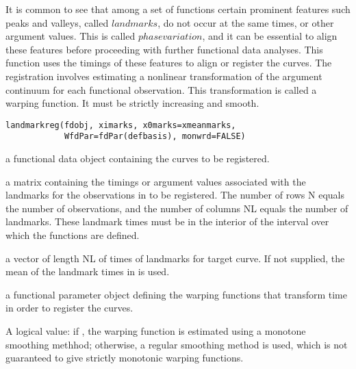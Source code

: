 \begin{Description}\relax
It is common to see that among a set of functions certain prominent
features such peaks and valleys, called $landmarks$, do not occur
at the same times, or other
argument values.  This is called $phase variation$, and it can be
essential to align these features before proceeding with further
functional data analyses.  This function uses the timings of these
features to align or register the curves.  The registration involves
estimating a nonlinear transformation of the argument continuum for each
functional observation.  This transformation is called a warping
function. It must be strictly increasing and smooth.
\end{Description}
\begin{Usage}
\begin{verbatim}
landmarkreg(fdobj, ximarks, x0marks=xmeanmarks,
            WfdPar=fdPar(defbasis), monwrd=FALSE)
\end{verbatim}
\end{Usage}
\begin{Arguments}
\begin{ldescription}
\item[\code{fdobj}] a functional data object containing the curves to be registered.

\item[\code{ximarks}] a matrix containing the timings or argument values associated with the
landmarks for the observations in  to be registered.  The
number of rows N
equals the number of observations, and the number of columns NL equals the
number of landmarks. These landmark times must be in the interior of the
interval over which the functions are defined.

\item[\code{x0marks}] a vector of length NL of times of landmarks for target curve.  If
not supplied, the mean of the landmark times in 
is used.

\item[\code{WfdPar}] a functional parameter object defining the warping functions
that transform time in order to register the curves.

\item[\code{monwrd}] A logical value:
if , the warping function is estimated using a monotone
smoothing methhod; otherwise, a regular smoothing method is used,
which is not guaranteed to give strictly monotonic warping
functions.

\end{ldescription}
\end{Arguments}
